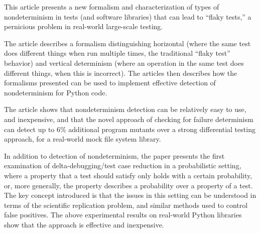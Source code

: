 \documentclass{article}
\begin{document}

\vspace{0.1in}


\vspace{0.1in}

\noindent This article presents a new formalism and characterization of types of nondeterminism in tests (and software libraries) that can lead to ``flaky tests,'' a pernicious problem in real-world large-scale testing.

\vspace{0.1in}

\noindent The article describes a formalism distinguishing horizontal (where the same test does different things when run multiple times, the traditional ``flaky test'' behavior) and vertical determinism (where an operation in the same test does different things, when this is incorrect).  The articles then describes how the formalisms presented can be used to implement effective detection of nondeterminism for Python code.

\vspace{0.1in}

\noindent The article shows that nondeterminism detection can be relatively easy to use, and inexpensive, and that the novel approach of checking for failure determinism can detect up to 6\% additional program mutants over a strong differential testing approach, for a real-world mock file system library.

\vspace{0.1in}

\noindent In addition to detection of nondeterminism, the paper presents the first examination of delta-debugging/test case reduction in a probabilistic setting, where a property that a test should satisfy only holds with a certain probability, or, more generally, the property describes a probability over a property of a test.  The key concept introduced is that the issues in this setting can be understood in terms of the scientific replication problem, and similar methods used to control false positives.  The above experimental results on real-world Python libraries show that the approach is effective and inexpensive.
\end{document}
